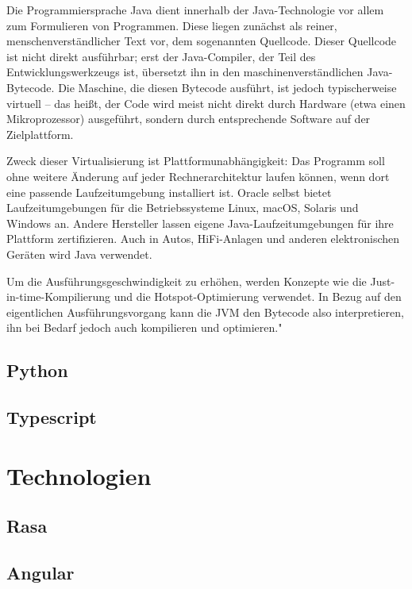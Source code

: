 Die Programmiersprache Java dient innerhalb der Java-Technologie vor allem zum Formulieren von Programmen. Diese liegen zunächst als reiner, menschenverständlicher Text vor, dem sogenannten Quellcode. Dieser Quellcode ist nicht direkt ausführbar; erst der Java-Compiler, der Teil des Entwicklungswerkzeugs ist, übersetzt ihn in den maschinenverständlichen Java-Bytecode. Die Maschine, die diesen Bytecode ausführt, ist jedoch typischerweise virtuell – das heißt, der Code wird meist nicht direkt durch Hardware (etwa einen Mikroprozessor) ausgeführt, sondern durch entsprechende Software auf der Zielplattform.

Zweck dieser Virtualisierung ist Plattformunabhängigkeit: Das Programm soll ohne weitere Änderung auf jeder Rechnerarchitektur laufen können, wenn dort eine passende Laufzeitumgebung installiert ist. Oracle selbst bietet Laufzeitumgebungen für die Betriebssysteme Linux, macOS, Solaris und Windows an. Andere Hersteller lassen eigene Java-Laufzeitumgebungen für ihre Plattform zertifizieren. Auch in Autos, HiFi-Anlagen und anderen elektronischen Geräten wird Java verwendet.

Um die Ausführungsgeschwindigkeit zu erhöhen, werden Konzepte wie die Just-in-time-Kompilierung und die Hotspot-Optimierung verwendet. In Bezug auf den eigentlichen Ausführungsvorgang kann die JVM den Bytecode also interpretieren, ihn bei Bedarf jedoch auch kompilieren und optimieren."\cite{java}

\subsection{Python}

\subsection{Typescript}

\section{Technologien}

\subsection{Rasa}

\subsection{Angular}

